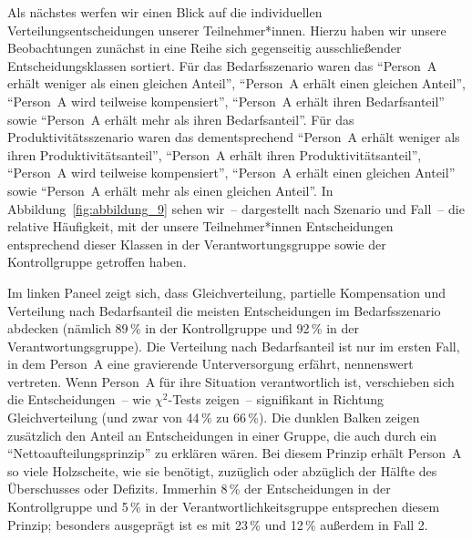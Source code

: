 \documentclass[justified,nobib,nohyper,symmetric,twoside]{tufte-book}
\begin{document}
Als nächstes werfen wir einen Blick auf die individuellen Verteilungsentscheidungen unserer Teilnehmer*innen.
Hierzu haben wir unsere Beobachtungen zunächst in eine Reihe sich gegenseitig ausschließender Entscheidungsklassen sortiert.
Für das Bedarfsszenario waren das \enquote{Person~A erhält weniger als einen gleichen Anteil}, \enquote{Person~A erhält einen gleichen Anteil}, \enquote{Person~A wird teilweise kompensiert}, \enquote{Person~A erhält ihren Bedarfsanteil} sowie \enquote{Person~A erhält mehr als ihren Bedarfsanteil}.
Für das Produktivitätsszenario waren das dementsprechend \enquote{Person~A erhält weniger als ihren Produktivitätsanteil}, \enquote{Person~A erhält ihren Produktivitätsanteil}, \enquote{Person~A wird teilweise kompensiert}, \enquote{Person~A erhält einen gleichen Anteil} sowie \enquote{Person~A erhält mehr als einen gleichen Anteil}.
In Abbildung~\ref{fig:abbildung_9} sehen wir~-- dargestellt nach Szenario und Fall~-- die relative Häufigkeit, mit der unsere Teilnehmer*innen Entscheidungen entsprechend dieser Klassen in der Verantwortungsgruppe sowie der Kontrollgruppe getroffen haben.

Im linken Paneel zeigt sich, dass Gleichverteilung, partielle Kompensation und Verteilung nach Bedarfsanteil die meisten Entscheidungen im Bedarfsszenario abdecken (nämlich 89\,\% in der Kontrollgruppe und 92\,\% in der Verantwortungsgruppe).
Die Verteilung nach Bedarfsanteil ist nur im ersten Fall, in dem Person~A eine gravierende Unterversorgung erfährt, nennenswert vertreten.
Wenn Person~A für ihre Situation verantwortlich ist, verschieben sich die Entscheidungen~-- wie $\chi^{2}$-Tests zeigen~-- signifikant in Richtung Gleichverteilung (und zwar von 44\,\% zu 66\,\%).
Die dunklen Balken zeigen zusätzlich den Anteil an Entscheidungen in einer Gruppe, die auch durch ein \enquote{Nettoaufteilungsprinzip} zu erklären wären.
Bei diesem Prinzip erhält Person~A so viele Holzscheite, wie sie benötigt, zuzüglich oder abzüglich der Hälfte des Überschusses oder Defizits.
Immerhin 8\,\% der Entscheidungen in der Kontrollgruppe und 5\,\% in der Verantwortlichkeitsgruppe entsprechen diesem Prinzip; besonders ausgeprägt ist es mit 23\,\% und 12\,\% außerdem in Fall 2.
\end{document}

